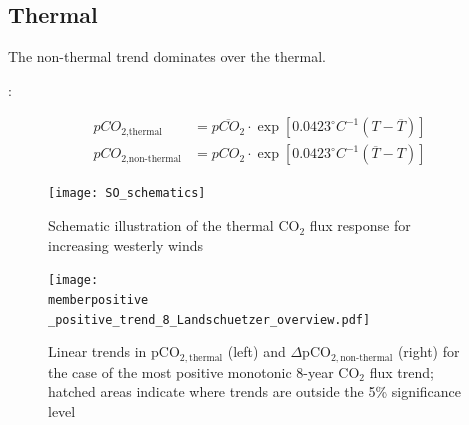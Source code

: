 \documentclass[aspectratio=169]{beamer}
\newcommand{\memberpositive}{m178_1985_1992} %
\begin{document}
\subsection{Thermal}
\begin{frame}{The non-thermal trend dominates over the thermal.}
\begin{minipage}{.3\textwidth}
\citep{Takahashi2002}:
\end{minipage} \hfill
	\begin{minipage}{.66\textwidth}
\begin{align*}
pCO_{\text{2,thermal}}&=\overline{pCO_2} \cdot \exp \left[ 0.0423 ^{\circ}C^{-1}\left( T - \overline{T} \right) \right] \\
pCO_{\text{2,non-thermal}}&=pCO_2 \cdot \exp \left[ 0.0423 ^{\circ}C^{-1}\left( \overline{T} - T \right) \right] 
\end{align*} 
\end{minipage}
	\centering
	\begin{minipage}{.3\textwidth}
		
		\begin{figure}[h!]
			\centering
			\vspace{-1mm}
			\texttt{[image: SO\_schematics]}
			\caption{Schematic illustration of the thermal CO$_2$ flux response for increasing westerly winds}
			\label{fig:schematics_neg}
		\end{figure}		
	
		
	\end{minipage} \hfill
	\begin{minipage}{.66\textwidth}
		\begin{figure}[h!]
\centering
	\texttt{[image: \\memberpositive \_positive\_trend\_8\_Landschuetzer\_overview.pdf]}
	\caption{Linear trends in pCO$_{2,\text{thermal}}$ (left) and $\Delta$pCO$_{2,\text{non-thermal}}$ (right) for the case of the most positive monotonic 8-year CO$_2$ flux trend; hatched areas indicate where trends are outside the 5\% significance level}
	\label{fig:thermal_pos}
\end{figure}
	\end{minipage}
\end{frame}
\end{document}
